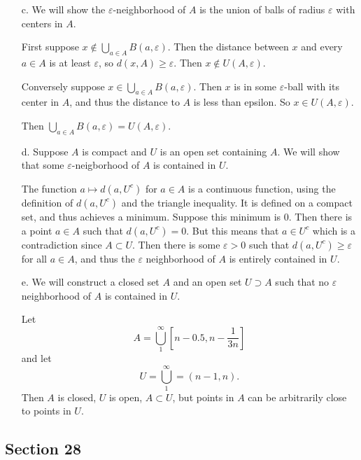 \documentclass[11pt, reqno]{article}
\theoremstyle{plain}
\theoremstyle{definition}
\theoremstyle{remark}
\renewcommand{\epsilon}{\varepsilon}
\begin{document}
\begin{enumerate}
\begin{enumerate}
        \item[c.] We will show the $\epsilon$-neighborhood of $A$ is the union of balls of radius $\epsilon$ 
        with centers in $A$. 

        First suppose $x \notin \bigcup_{a \in A} B(a, \epsilon)$. Then the distance between $x$ and every $a \in A$
        is at least $\epsilon$, so $d(x, A) \geq \epsilon$. Then $x \notin U(A, \epsilon)$. 

        Conversely suppose $x \in \bigcup_{a \in A} B(a, \epsilon)$. Then $x$ is in some $\epsilon$-ball with its 
        center in $A$, and thus the distance to $A$ is less than epsilon. So $x \in U(A, \epsilon)$.

        Then $\bigcup_{a \in A} B(a, \epsilon) = U(A, \epsilon)$.

        \item[d.] Suppose $A$ is compact and $U$ is an open set containing $A$. We will show that 
        some $\epsilon$-neigborhood of $A$ is contained in $U$. 

        The function $a \mapsto d(a, U^c)$ for $a \in A$ is a continuous function, using the definition of 
        $d(a, U^c)$ and the triangle inequality. It is defined on a compact set, and thus achieves a minimum. Suppose
        this minimum is $0$. Then there is a point $a \in A$ such that $d(a, U^c) = 0$. But this means that 
        $a \in U^c$ which is a contradiction since $A \subset U$. Then there is some $\epsilon > 0$ such that 
        $d(a, U^c) \geq \epsilon$ for all $a \in A$, and thus the $\epsilon$ neighborhood of $A$ is entirely contained in $U$.

        \item[e.] We will construct a closed set $A$ and an open set $U \supset A$ such that no $\epsilon$ neighborhood of $A$
        is contained in $U$. 

        Let
        \[
            A = \bigcup_1^\infty [n-0.5, n - \frac{1}{3n}]
        \]
        and let 
        \[
            U = \bigcup_1^\infty = (n-1, n).
        \]
        Then $A$ is closed, $U$ is open, $A \subset U$, but points in $A$ can be arbitrarily close to points in $U$. 
    \end{enumerate}
\end{enumerate}

\subsection*{Section 28}
\end{document}
